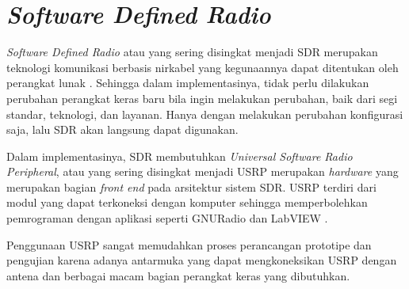 \section{\textit{Software Defined Radio}}
\textit{Software Defined Radio} atau yang sering disingkat menjadi SDR merupakan teknologi komunikasi berbasis nirkabel yang kegunaannya dapat ditentukan oleh perangkat lunak \cite{Anisah2018}. Sehingga dalam implementasinya, tidak perlu dilakukan perubahan perangkat keras baru bila ingin melakukan perubahan, baik dari segi standar, teknologi, dan layanan. Hanya dengan melakukan perubahan konfigurasi saja, lalu SDR akan langsung dapat digunakan. 

Dalam implementasinya, SDR membutuhkan \textit{Universal Software Radio Peripheral}, atau yang sering disingkat menjadi USRP merupakan \textit{hardware} yang merupakan bagian \textit{front end} pada arsitektur sistem SDR. USRP terdiri dari modul yang dapat terkoneksi dengan komputer sehingga memperbolehkan pemrograman dengan aplikasi seperti GNURadio dan LabVIEW \cite{Gulo2023}. 

Penggunaan USRP sangat memudahkan proses perancangan prototipe dan pengujian karena adanya antarmuka yang dapat mengkoneksikan USRP dengan antena dan berbagai macam bagian perangkat keras yang dibutuhkan.

